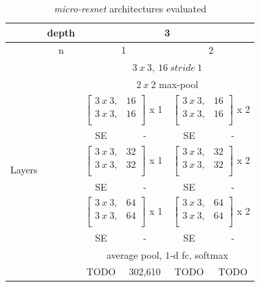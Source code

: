 \documentclass[../document.tex]{subfiles}
\begin{document}
\begin{table}[H]
    \centering
        \begin{tabular}{@{}lc|cccc@{}}
        \hline
        & depth   &  \multicolumn{4}{c}{3}  \\ 
        \hline 
        & n   & \multicolumn{2}{c}{1} & \multicolumn{2}{c}{2}\\
        \hline
    \multirow{12}{*}{Layers}
     & &\multicolumn{4}{c}{$3 \ x\ 3,\ 16 \ stride\ 1$} \\ 
     \cline{3-6}
     & &\multicolumn{4}{c}{$2 \ x\ 2$ max-pool} \\ 
     \cline{3-6}
     & & \multicolumn{2}{c}{$\begin{bmatrix}
      3\ x\ 3, & 16 \\
      3\ x \ 3, & 16 \\  
     \end{bmatrix}$ x 1} & \multicolumn{2}{c}{$\begin{bmatrix}
        3\ x\ 3, & 16 \\
        3\ x \ 3, & 16 \\  
       \end{bmatrix}$ x 2}\\ 
       \cline{3-6}
     & & SE & - & SE & -\\ 
     \cline{3-6}
     & & \multicolumn{2}{c}{$\begin{bmatrix}
        3\ x \ 3, & 32 \\
        3\ x\ 3, & 32 \\  
       \end{bmatrix}$ x 1} & \multicolumn{2}{c}{$\begin{bmatrix}
        3\ x\ 3, & 32 \\
        3\ x \ 3, & 32 \\  
       \end{bmatrix}$ x 2} \\
       \cline{3-6}
       & & SE & - & SE & -\\ 
       \cline{3-6}
       & & \multicolumn{2}{c}{$\begin{bmatrix}
        3\ x \ 3, & 64 \\
        3 \ x \ 3, & 64 \\  
       \end{bmatrix}$ x 1} & \multicolumn{2}{c}{$\begin{bmatrix}
        3\ x\ 3, & 64 \\
        3\ x \ 3, & 64 \\  
       \end{bmatrix}$ x 2}\\  
       \cline{3-6}
       & & SE & - & SE & -\\ 
       \cline{3-6}
       & & \multicolumn{4}{c}{average pool, $1$-d fc, softmax} \\ 
       \hline

       Parameters & & TODO & 302,610  & TODO & TODO \\
       \hline
    \end{tabular}
    \caption{\emph{micro-resnet} architectures evaluated}
\end{table}
\end{document}
